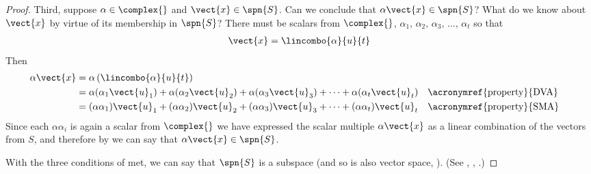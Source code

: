 \begin{proof}
%
Third, suppose $\alpha\in\complex{\null}$ and $\vect{x}\in\spn{S}$.  Can we conclude that $\alpha\vect{x}\in\spn{S}$?  What do we know about $\vect{x}$  by virtue of its membership in $\spn{S}$?  There must be scalars from $\complex{\null}$,
$\alpha_1,\,\alpha_2,\,\alpha_3,\,\ldots,\,\alpha_t$ so that
%
\begin{align*}
\vect{x}&=\lincombo{\alpha}{u}{t}\\
\end{align*}
%
Then
%
\begin{align*}
\alpha\vect{x}&=\alpha\left(\lincombo{\alpha}{u}{t}\right)\\
&=\alpha(\alpha_1\vect{u}_1)+\alpha(\alpha_2\vect{u}_2)+\alpha(\alpha_3\vect{u}_3)+\cdots+\alpha(\alpha_t\vect{u}_t)&&\text{\acronymref{property}{DVA}}\\
&=(\alpha\alpha_1)\vect{u}_1+(\alpha\alpha_2)\vect{u}_2+(\alpha\alpha_3)\vect{u}_3+\cdots+(\alpha\alpha_t)\vect{u}_t&&\text{\acronymref{property}{SMA}}\\
\end{align*}
%
Since each $\alpha\alpha_i$ is again a scalar from $\complex{\null}$ we have expressed the scalar multiple $\alpha\vect{x}$ as a linear combination of the vectors from $S$, and therefore by  we can say that $\alpha\vect{x}\in\spn{S}$.\par
%
With the three conditions of  met, we can say that $\spn{S}$ is a subspace (and so is also vector space, ).
(See , , .)
\end{proof}
%
